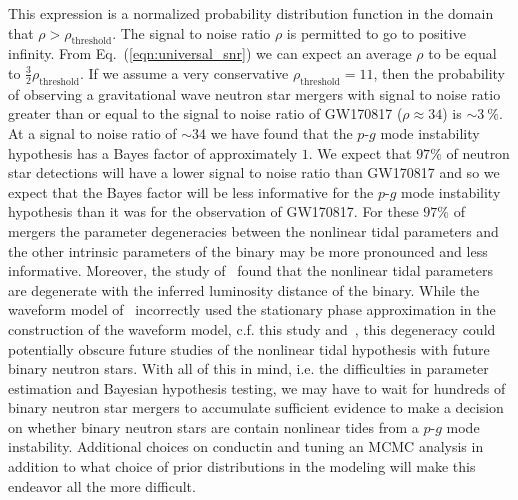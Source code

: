 This expression is a normalized probability distribution function in the domain that $\rho > \rho_{\mathrm{threshold}}$. The signal to noise ratio $\rho$ is permitted to go to positive infinity. From Eq.~(\ref{eqn:universal_snr}) we can expect an average $\rho$ to be equal to $\frac{3}{2} \rho_{\mathrm{threshold}}$. If we assume a very conservative $\rho_{\mathrm{threshold}} = 11$, then the probability of observing a gravitational wave neutron star mergers with signal to noise ratio greater than or equal to the signal to noise ratio of GW170817 ($\rho \approx 34$) is $\sim 3~\%$. At a signal to noise ratio of $\sim 34$ we have found that the $p$-$g$ mode instability hypothesis has a Bayes factor of approximately $1$. We expect that $97 \%$ of neutron star detections will have a lower signal to noise ratio than GW170817 and so we expect that the Bayes factor will be less informative for the $p$-$g$ mode instability hypothesis than it was for the observation of GW170817. For these $97 \%$ of mergers the parameter degeneracies between the nonlinear tidal parameters and the other intrinsic parameters of the binary may be more pronounced and less informative. Moreover, the study of~\cite{Essick:2016tkn} found that the nonlinear tidal parameters are degenerate with the inferred luminosity distance of the binary. While the waveform model of~\cite{Essick:2016tkn} incorrectly used the stationary phase approximation in the construction of the waveform model, c.f. this study and~\cite{abbott2019constraining}, this degeneracy could potentially obscure future studies of the nonlinear tidal hypothesis with future binary neutron stars. With all of this in mind, i.e. the difficulties in parameter estimation and Bayesian hypothesis testing, we may have to wait for hundreds of binary neutron star mergers to accumulate sufficient evidence to make a decision on whether binary neutron stars are contain nonlinear tides from a $p$-$g$ mode instability. Additional choices on conductin and tuning an MCMC analysis in addition to what choice of prior distributions in the modeling will make this endeavor all the more difficult.


